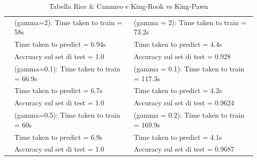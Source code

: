 \documentclass{article}
\begin{document}
\begin{table}[htbp]
\begin{adjustbox}{width=\textwidth}
\begin{tabularx}{\textwidth}{|>{\centering\arraybackslash}X|>{\centering\arraybackslash}X|>{\centering\arraybackslash}X|}
	  & (gamma=2): Time taken to train = 58s & (gamma = 2): Time taken to train = 73.2s\\
	  & Time taken to predict = 6.94s & Time taken to predict = 4.4s\\
	  & Accruacy sul set di test = 1.0 & Accuracy sul set di test = 0.928\\
	  & (gamma=0.1): Time taken to train = 66.9s & (gamma = 0.1): Time taken to train = 117.3s\\
	  & Time taken to predict = 6.7s & Time taken to predict = 4.2s\\
	  & Accuracy sul set di test = 1.0 & Accuracy sul set di test = 0.9624\\
	  & (gamma=0.5): Time taken to train = 60s & (gamma = 0.2): Time taken to train = 169.9s\\
	  & Time taken to predict = 6.9s & Time taken to predict = 4.1s\\
	  & Accuracy sul set di test = 1.0 & Accuracy sul set di test = 0.9687\\
	  \hline
	  \end{tabularx}
    \end{adjustbox}
	\caption{Tabella Rice \& Cammeo e King-Rook vs King-Pawn}
  \end{table}
\end{document}
